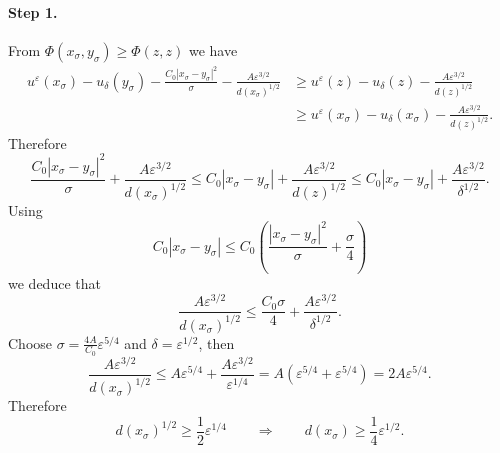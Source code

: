 \documentclass[11pt,reqno]{amsart}
\numberwithin{figure}{section}
\theoremstyle{plain}
\theoremstyle{remark}
\numberwithin{equation}{section}
\begin{document}
\paragraph{Step 1.} From $\Phi(x_\sigma,y_\sigma)\geq \Phi(z,z)$ we have
\begin{align*}
    u^\varepsilon(x_\sigma) - u_\delta(y_\sigma) - \frac{C_0|x_\sigma - y_\sigma|^2}{\sigma} - \frac{A\varepsilon^{3/2}}{d(x_\sigma)^{1/2}} &\geq u^\varepsilon(z) - u_\delta(z) - \frac{A\varepsilon^{3/2}}{d(z)^{1/2}}\\
    &\geq u^\varepsilon(x_\sigma) - u_\delta(x_\sigma) - \frac{A\varepsilon^{3/2}}{d(z)^{1/2}}.
\end{align*}
Therefore
\begin{equation*}
    \frac{C_0|x_\sigma - y_\sigma|^2}{\sigma} + \frac{A\varepsilon^{3/2}}{d(x_\sigma)^{1/2}} \leq C_0|x_\sigma - y_\sigma|+\frac{A\varepsilon^{3/2}}{d(z)^{1/2}} \leq C_0|x_\sigma - y_\sigma|+\frac{A\varepsilon^{3/2}}{\delta^{1/2}} .
\end{equation*}
Using
\begin{equation*}
    C_0|x_\sigma-y_\sigma| \leq C_0\left(\frac{|x_\sigma - y_\sigma|^2}{\sigma}+\frac{\sigma}{4}\right) 
\end{equation*}
we deduce that
\begin{equation}\label{sleep}
    \frac{A\varepsilon^{3/2}}{d(x_\sigma)^{1/2}} \leq \frac{C_0\sigma}{4} + \frac{A\varepsilon^{3/2}}{\delta^{1/2}}.
\end{equation}
Choose $\sigma = \frac{4A}{C_0}\varepsilon^{5/4}$ and $\delta = \varepsilon^{1/2}$, then
\begin{equation*}
     \frac{A\varepsilon^{3/2}}{d(x_\sigma)^{1/2}} \leq A\varepsilon^{5/4} + \frac{A\varepsilon^{3/2}}{\varepsilon^{1/4}} = A(\varepsilon^{5/4} +\varepsilon^{5/4}) = 2A\varepsilon^{5/4}.
\end{equation*}
Therefore
\begin{equation*}
    d(x_\sigma)^{1/2} \geq \frac{1}{2}\varepsilon^{1/4} \qquad\Longrightarrow\qquad d(x_\sigma) \geq \frac{1}{4}\varepsilon^{1/2}.
\end{equation*}
\end{document}

